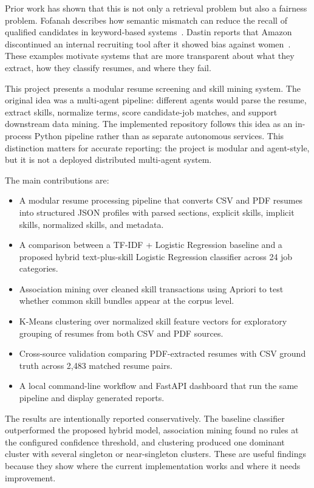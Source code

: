 \documentclass[sigconf, authorversion, nonacm]{acmart}
\begin{document}
Prior work has shown that this is not only a retrieval problem but also a fairness problem. Fofanah describes how semantic mismatch can reduce the recall of qualified candidates in keyword-based systems~\cite{fofanah2026}. Dastin reports that Amazon discontinued an internal recruiting tool after it showed bias against women~\cite{dastin2018}. These examples motivate systems that are more transparent about what they extract, how they classify resumes, and where they fail.

This project presents a modular resume screening and skill mining system. The original idea was a multi-agent pipeline: different agents would parse the resume, extract skills, normalize terms, score candidate-job matches, and support downstream data mining. The implemented repository follows this idea as an in-process Python pipeline rather than as separate autonomous services. This distinction matters for accurate reporting: the project is modular and agent-style, but it is not a deployed distributed multi-agent system.

The main contributions are:

\begin{itemize}
  \item A modular resume processing pipeline that converts CSV and PDF resumes into structured JSON profiles with parsed sections, explicit skills, implicit skills, normalized skills, and metadata.
  \item A comparison between a TF-IDF + Logistic Regression baseline and a proposed hybrid text-plus-skill Logistic Regression classifier across 24 job categories.
  \item Association mining over cleaned skill transactions using Apriori to test whether common skill bundles appear at the corpus level.
  \item K-Means clustering over normalized skill feature vectors for exploratory grouping of resumes from both CSV and PDF sources.
  \item Cross-source validation comparing PDF-extracted resumes with CSV ground truth across 2,483 matched resume pairs.
  \item A local command-line workflow and FastAPI dashboard that run the same pipeline and display generated reports.
\end{itemize}

The results are intentionally reported conservatively. The baseline classifier outperformed the proposed hybrid model, association mining found no rules at the configured confidence threshold, and clustering produced one dominant cluster with several singleton or near-singleton clusters. These are useful findings because they show where the current implementation works and where it needs improvement.
\end{document}
